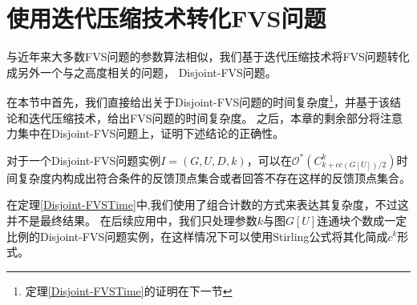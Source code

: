 \section{使用迭代压缩技术转化FVS问题}
与近年来大多数FVS问题的参数算法相似，我们基于迭代压缩技术将FVS问题转化成另外一个与之高度相关的问题，
Disjoint-FVS问题。

在本节中首先，我们直接给出关于Disjoint-FVS问题的时间复杂度\footnote{定理\ref{Disjoint-FVSTime}的证明在下一节}，并基于该结论和迭代压缩技术，给出FVS问题的时间复杂度。
之后，本章的剩余部分将注意力集中在Disjoint-FVS问题上，证明下述结论的正确性。
\begin{theorem} \label{Disjoint-FVSTime}
  对于一个Disjoint-FVS问题实例$I = (G, U, D, k)$，可以在$\mathcal{O}^*(C^k_{k + cc(G[U])/2})$时间复杂度内构成出符合条件的反馈顶点集合或者回答不存在这样的反馈顶点集合。
\end{theorem}

在定理\ref{Disjoint-FVSTime}中,我们使用了组合计数的方式来表达其复杂度，不过这并不是最终结果。
在后续应用中，我们只处理参数$k$与图$G[U]$连通块个数成一定比例的Disjoint-FVS问题实例，在这样情况下可以使用Stirling公式将其化简成$c^k$形式。

